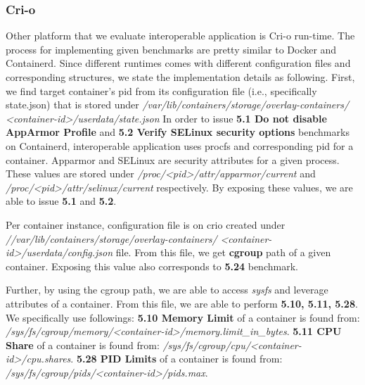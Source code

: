 \subsubsection*{Cri-o}


Other platform that we evaluate interoperable application is Cri-o  run-time. The process for implementing given benchmarks are pretty similar to Docker and Containerd.
Since different runtimes comes with different configuration files and corresponding structures, we state the implementation details as following.
First, we find target container's pid from its configuration file (i.e., specifically state.json) that is stored under \textit{/var/lib/containers/storage/overlay-containers/} \textit{<container-id>/userdata/state.json}
In order to issue \textbf{5.1 Do not disable AppArmor Profile} and \textbf{5.2 Verify SELinux security options} benchmarks on Containerd, interoperable application
uses procfs and corresponding pid for a container. Apparmor and SELinux are security attributes for a given process. 
These values are stored under \textit{/proc/<pid>/attr/apparmor/current} and \textit{/proc/<pid>/attr/selinux/current} respectively. 
By exposing these values, we are able to issue \textbf{5.1} and \textbf{5.2}.

Per container instance, configuration file is on crio created under \textit{//var/lib/containers/storage/overlay-containers/} \textit{<container-id>/userdata/config.json} file.
From this file, we get \textbf{cgroup} path of a given container. Exposing this value also corresponds to \textbf{5.24} benchmark.

Further, by using the cgroup path, we are able to access \textit{sysfs} and leverage attributes of a container. 
 From this file, we are able to perform \textbf{5.10, 5.11, 5.28}. 
 We specifically use followings:  \textbf{5.10 Memory Limit} of a container is found from: \textit{/sys/fs/cgroup/memory/<container-id>/memory.limit\_in\_bytes}.
\textbf{5.11 CPU Share} of a container is found from: \textit{/sys/fs/cgroup/cpu/<container-id>/cpu.shares}.
\textbf{5.28 PID Limits} of a container is found from: \textit{/sys/fs/cgroup/pids/<container-id>/pids.max}.
 